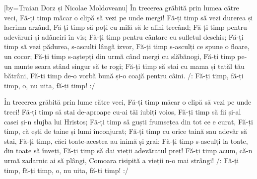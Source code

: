 [by={Traian Dorz și Nicolae Moldoveanu}]
\beginverse
În trecerea grăbită prin lumea către veci,
Fă-ți timp măcar o clipă să vezi pe unde mergi!
Fă-ți timp să vezi durerea și lacrima arzând,
Fă-ți timp să poți cu milă să le alini trecând;
Fă-ți timp pentru-adevăruri și adânciri în vis;
Fă-ți timp pentru cântare cu sufletul deschis;
Fă-ți timp să vezi pădurea, s-asculți lângă izvor,
Fă-ți timp s-asculți ce spune o floare, un cocor;
Fă-ți timp s-aștepți din urmă când mergi cu slăbănogi,
Fă-ți timp pe-un munte seara stând singur să te rogi;
Fă-ți timp să stai cu mama și tatăl tău bătrâni,
Fă-ți timp de-o vorbă bună și-o coajă pentru câini.
/: Fă-ți timp, fă-ți timp, o, nu uita, fă-ți timp! :/
\endverse

\beginverse
În trecerea grăbită prin lume către veci,
Fă-ți timp măcar o clipă să vezi pe unde treci!
Fă-ți timp să stai de-aproape cu-ai tăi iubiți voios,
Fă-ți timp să fii și-al casei și-n slujba lui Hristos;
Fă-ți timp să guști frumsețea din tot ce e curat,
Fă-ți timp, că ești de taine și lumi înconjurat;
Fă-ți timp cu orice taină sau adevăr să stai,
Fă-ți timp, căci toate-acestea au inimă și grai;
Fă-ți timp s-asculți la toate, din toate să înveți,
Fă-ți timp să dai vieții adevăratul preț!
Fă-ți timp acum, că-n urmă zadarnic ai să plângi,
Comoara risipită a vieții n-o mai strângi!
/: Fă-ți timp, fă-ți timp, o, nu uita, fă-ți timp! :/
\endverse
\endsong
